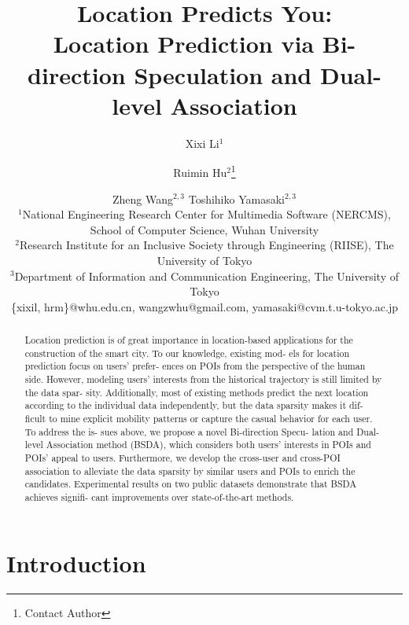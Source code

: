 \documentclass{article}
\title{Location Predicts You:\\
Location Prediction via Bi-direction Speculation and Dual-level Association}
\author{
Xixi Li$^1$\and
Ruimin Hu$^2$\footnote{Contact Author} \and
Zheng Wang$^{2,3}$\And
Toshihiko Yamasaki$^{2,3}$\\
\affiliations
$^1$National Engineering Research Center for Multimedia Software (NERCMS),\\ School of Computer Science, Wuhan University\\
$^2$Research Institute for an Inclusive Society through Engineering (RIISE), The University of Tokyo\\
$^3$Department of Information and Communication Engineering, The University of Tokyo\\
\emails
\{xixil, hrm\}@whu.edu.cn,
wangzwhu@gmail.com,
yamasaki@cvm.t.u-tokyo.ac.jp
}
\begin{document}
\maketitle

\begin{abstract}
Location prediction is of great importance in location-based applications for the construction of 
the smart city. To our knowledge, existing mod-
els for location prediction focus on users’ prefer-
ences on POIs from the perspective of the human
side. However, modeling users’ interests from the
historical trajectory is still limited by the data spar-
sity. Additionally, most of existing methods predict
the next location according to the individual data
independently, but the data sparsity makes it dif-
ficult to mine explicit mobility patterns or capture
the casual behavior for each user. To address the is-
sues above, we propose a novel Bi-direction Specu-
lation and Dual-level Association method (BSDA),
which considers both users’ interests in POIs and
POIs’ appeal to users. Furthermore, we develop the
cross-user and cross-POI association to alleviate
the data sparsity by similar users and POIs to enrich
the candidates. Experimental results on two public
datasets demonstrate that BSDA achieves signifi-
cant improvements over state-of-the-art methods.
\end{abstract}

\section{Introduction}
\end{document}
